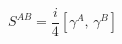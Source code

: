 \begin{equation}\label{SAB} 
S^{AB}=\frac{i}{4}\left[\gamma^{A},\,\gamma^{B}
\right]
\end{equation}

